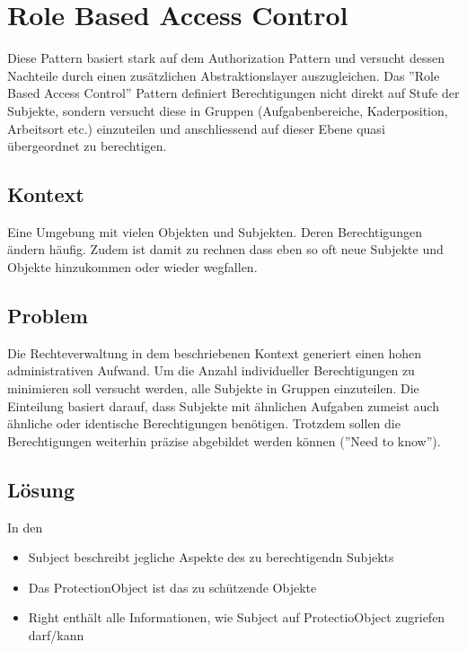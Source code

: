 \section{Role Based Access Control}

Diese Pattern basiert stark auf dem Authorization Pattern und versucht dessen Nachteile durch einen zusätzlichen Abstraktionslayer auszugleichen.
Das ''Role Based Access Control'' Pattern definiert Berechtigungen nicht direkt auf Stufe der Subjekte, sondern versucht diese in Gruppen (Aufgabenbereiche, Kaderposition, Arbeitsort etc.) einzuteilen und anschliessend auf dieser Ebene quasi übergeordnet zu berechtigen.

\subsection*{Kontext}
Eine Umgebung mit vielen Objekten und Subjekten. Deren Berechtigungen ändern häufig. Zudem ist damit zu rechnen dass eben so oft neue Subjekte und Objekte hinzukommen oder wieder wegfallen.

\subsection*{Problem}
Die Rechteverwaltung in dem beschriebenen Kontext generiert einen hohen administrativen Aufwand. Um die Anzahl individueller Berechtigungen zu minimieren soll versucht werden, alle Subjekte in Gruppen einzuteilen. Die Einteilung basiert darauf, dass Subjekte mit ähnlichen Aufgaben zumeist auch ähnliche oder identische Berechtigungen benötigen.
Trotzdem sollen die Berechtigungen weiterhin präzise abgebildet werden können (''Need to know'').

\subsection*{Lösung}
In den 









\begin{itemize}
	\item Subject beschreibt jegliche Aspekte des zu berechtigendn Subjekts
	\item Das ProtectionObject ist das zu schützende Objekte
	\item Right enthält alle Informationen, wie Subject auf ProtectioObject zugriefen darf/kann
\end{itemize}


